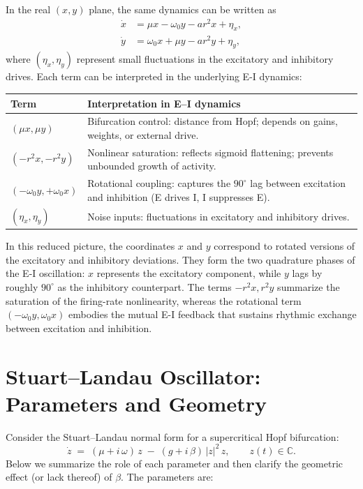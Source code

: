 In the real $(x,y)$ plane, the same dynamics can be written as
\begin{align}
\dot{x} &= \mu x - \omega_0 y - a r^2 x + \eta_x,\\
\dot{y} &= \omega_0 x + \mu y - a r^2 y + \eta_y,
\end{align}
where $(\eta_x, \eta_y)$ represent small fluctuations in the excitatory and inhibitory drives.
Each term can be interpreted in the underlying E-I dynamics:

\begin{center}
\renewcommand{\arraystretch}{1.2}
\begin{tabularx}{0.95\linewidth}{lX}
\toprule
\textbf{Term} & \textbf{Interpretation in E--I dynamics}\\
\midrule
$(\mu x, \mu y)$ & Bifurcation control: distance from Hopf; depends on gains, weights, or external drive.\\
$(-r^2x, -r^2y)$ & Nonlinear saturation: reflects sigmoid flattening; prevents unbounded growth of activity.\\
$(-\omega_0 y, +\omega_0 x)$ & Rotational coupling: captures the $90^\circ$ lag between excitation and inhibition (E drives I, I suppresses E).\\
$(\eta_x, \eta_y)$ & Noise inputs: fluctuations in excitatory and inhibitory drives.\\
\bottomrule
\end{tabularx}
\end{center}

In this reduced picture, the coordinates $x$ and $y$ correspond to rotated versions of the excitatory and inhibitory deviations. They form the two quadrature phases of the E-I oscillation: $x$ represents the excitatory component, while $y$ lags by roughly $90^\circ$ as the inhibitory counterpart.  
The terms $-r^2x,r^2y$ summarize the saturation of the firing-rate nonlinearity, whereas the rotational term $(-\omega_0 y, \omega_0 x)$ embodies the mutual E-I feedback that sustains rhythmic exchange between excitation and inhibition.



\clearpage \section{Stuart–Landau Oscillator: Parameters and Geometry}

Consider the Stuart–Landau normal form for a supercritical Hopf bifurcation:
\[
\dot z \;=\; (\mu + i\,\omega)\,z \;-\; (g + i\,\beta)\,\lvert z\rvert^2\,z,
\qquad z(t)\in\mathbb{C}.
\]
Below we summarize the role of each parameter and then clarify the geometric effect (or lack thereof) of \(\beta\). The parameters are:

